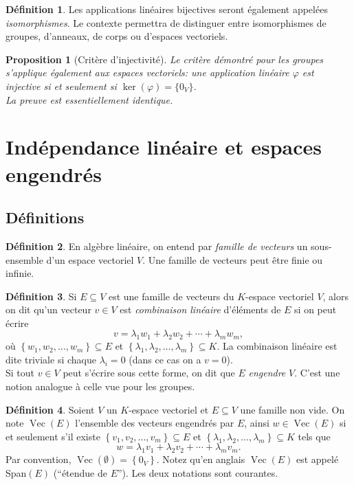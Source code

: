 \documentclass[oneside,12pt,french,table]{book}
\DeclareMathOperator{\Span}{Vec}
\newtheorem{prop}{Proposition}[section]
\theoremstyle{definition}
\theoremstyle{definition}
\theoremstyle{definition}
\newtheorem{definition}{Définition}[chapter]
\begin{document}
\begin{definition}
    Les applications linéaires bijectives seront également appelées \textit{isomorphismes}. Le contexte permettra de distinguer entre isomorphismes de groupes, d'anneaux, de corps ou d'espaces vectoriels.
\end{definition}    
\begin{prop}[Critère d'injectivité]
Le critère démontré pour les groupes s'applique également aux espaces vectoriels: une application linéaire $\varphi$ est injective si et seulement si $\ker(\varphi)= \{0_V\}$. \\
La preuve est essentiellement identique.
\end{prop}
\section{Indépendance linéaire et espaces engendrés}
\subsection{Définitions }
    \begin{definition}
        En algèbre linéaire, on entend par \textit{famille de vecteurs} un sous-ensemble d'un espace vectoriel $V$. Une famille de vecteurs peut être finie ou infinie.
    \end{definition}
    \begin{definition}
        Si $E \subseteq V$ est une famille de vecteurs du $K$-espace vectoriel $V$, alors on dit qu'un vecteur $v \in V$ est \textit{combinaison linéaire} d'éléments de $E$ si on peut écrire
        $$
        v=\lambda_{1} w_{1}+\lambda_{2} w_{2}+\cdots+\lambda_{m} w_{m},
        $$
        où $\left\{w_{1}, w_{2}, \ldots, w_{m}\right\} \subseteq E$ et $\left\{\lambda_{1}, \lambda_{2}, \ldots, \lambda_{m}\right\} \subseteq K$. La combinaison linéaire est dite triviale si chaque $\lambda_{i}=0$ (dans ce cas on a $v=0$). \\
        Si tout $v \in V$ peut s'écrire sous cette forme, on dit que $E$ \textit{engendre} $V$. C'est une notion analogue à celle vue pour les groupes.
        \end{definition}
    \begin{definition}
        Soient $V$ un $K$-espace vectoriel et $E \subseteq V$ une famille non vide.  On note $\Span(E)$ l'ensemble des vecteurs engendrés par $E$, ainsi $w \in \operatorname{Vec}(E)$ si et seulement s'il existe $\left\{v_{1}, v_{2}, \ldots, v_{m}\right\} \subseteq E$ et $\left\{\lambda_{1}, \lambda_{2}, \ldots, \lambda_{m}\right\} \subseteq K$ tels que
        $$
        w=\lambda_{1} v_{1}+\lambda_{2} v_{2}+\cdots+\lambda_{m} v_{m} .
        $$
        Par convention, $\operatorname{Vec}(\emptyset)=\left\{0_{V}\right\}$.
        Notez qu'en anglais $\Span(E)$ est appelé Span$(E)$ (``étendue de $E$''). Les deux notations sont courantes.
    \end{definition}
\end{document}
